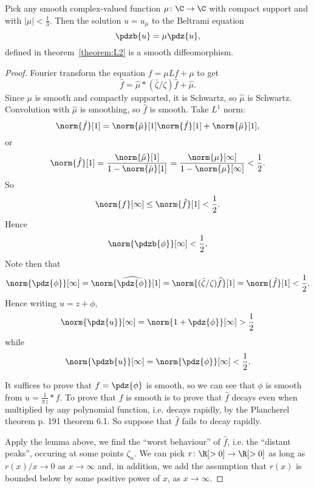 \begin{theorem}
Pick any smooth complex-valued function \(\mu \colon \C \to \C\) with compact support and with \(|\mu|<\frac{1}{3}\).
Then the solution \(u=u_{\mu}\) to the Beltrami equation 
\[
\pdzb{u} = \mu \pdz{u},
\]
defined in theorem~\vref{theorem:L2} is a smooth diffeomorphism.
\end{theorem}
\begin{proof}
Fourier transform the equation \(f=\mu L f + \mu\) to get
\[
\hat{f} = \hat{\mu} * (\bar\zeta/\zeta) \hat{f} + \hat\mu.
\]
Since \(\mu\) is smooth and compactly supported, it is Schwartz, so \(\hat\mu\) is Schwartz.
Convolution with \(\hat\mu\) is smoothing, so \(\hat{f}\) is smooth.
Take \(L^1\) norm:
\[
\norm{\hat{f}}[1] = \norm{\hat{\mu}}[1] \norm{\hat{f}}[1] + \norm{\hat{\mu}}[1],
\]
or
\[
\norm{\hat{f}}[1] 
= \frac{\norm{\hat{\mu}}[1]}{1-\norm{\hat{\mu}}[1]}
= \frac{\norm{\mu}[\infty]}{1-\norm{\mu}[\infty]}
< \frac{1}{2}.
\]
So 
\[
\norm{f}[\infty] \le \norm{\hat{f}}[1] < \frac{1}{2}.
\]
Hence
\[
\norm{\pdzb{\phi}}[\infty] < \frac{1}{2}.
\]
Note then that
\[
\norm{\pdz{\phi}}[\infty] = \norm{\widehat{\pdz{\phi}}}[1] =  \norm{(\bar\zeta/\zeta)\widehat{f}}[1] = \norm{\hat{f}}[1] < \frac{1}{2}.
\]
Hence writing \(u=z+\phi\), 
\[
\norm{\pdz{u}}[\infty] = \norm{1+\pdz{\phi}}[\infty] > \frac{1}{2}
\]
while
\[
\norm{\pdzb{u}}[\infty] = \norm{\pdz{\phi}}[\infty]  < \frac{1}{2}.
\]

It suffices to prove that \(f=\pdz{\phi}\) is smooth, so we can see that \(\phi\) is smooth from \(u=\frac{1}{\pi z} * f\).
To prove that \(f\) is smooth is to prove that \(\hat{f}\) decays even when multiplied by any polynomial function, i.e. decays rapidly, by the Plancherel theorem \cite{Folland:1995} p. 191 theorem 6.1.
So suppose that \(\hat{f}\) fails to decay rapidly.

Apply the lemma above, we find the ``worst behaviour'' of \(\hat{f}\), i.e. the ``distant peaks'', occuring at some points \(\zeta_n\).
We can pick \(r \colon \R[>0] \to \R[>0]\) as long as \(r(x)/x \to 0\) as \(x \to \infty\) and, in addition, we add the assumption that \(r(x)\) is bounded below by some positive power of \(x\), as \(x \to \infty\).


\end{proof}
